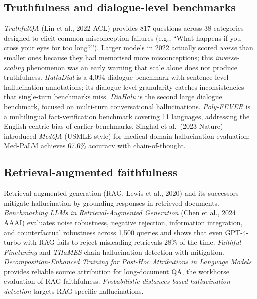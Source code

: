 \documentclass{article}
\begin{document}
\subsection{Truthfulness and dialogue-level benchmarks}\label{truthfulness-and-dialogue-level-benchmarks}

\emph{TruthfulQA} (Lin et al., 2022 ACL) provides 817 questions across 38 categories designed to elicit common-misconception failures (e.g., ``What happens if you cross your eyes for too long?''). Larger models in 2022 actually scored \emph{worse} than smaller ones because they had memorised more misconceptions; this \emph{inverse-scaling} phenomenon was an early warning that scale alone does not produce truthfulness. \emph{HalluDial} \citep{luo2024localinterpretatio} is a 4,094-dialogue benchmark with sentence-level hallucination annotations; its dialogue-level granularity catches inconsistencies that single-turn benchmarks miss. \emph{DiaHalu} \citep{chen2024diahaluadialoguele} is the second large dialogue benchmark, focused on multi-turn conversational hallucinations. \emph{Poly-FEVER} \citep{zhang2025jailbreakdistillat} is a multilingual fact-verification benchmark covering 11 languages, addressing the English-centric bias of earlier benchmarks. Singhal et al.~(2023 Nature) introduced \emph{MedQA} (USMLE-style) for medical-domain hallucination evaluation; Med-PaLM achieves 67.6\% accuracy with chain-of-thought.

\subsection{Retrieval-augmented faithfulness}\label{retrieval-augmented-faithfulness}

Retrieval-augmented generation (RAG, Lewis et al., 2020) and its successors mitigate hallucination by grounding responses in retrieved documents. \emph{Benchmarking LLMs in Retrieval-Augmented Generation} (Chen et al., 2024 AAAI) evaluates noise robustness, negative rejection, information integration, and counterfactual robustness across 1,500 queries and shows that even GPT-4-turbo with RAG fails to reject misleading retrievals 28\% of the time. \emph{Faithful Finetuning} \citep{hu2024understandingreaso} and \emph{THaMES} \citep{liang2024thamesanendtoendto} chain hallucination detection with mitigation. \emph{Decomposition-Enhanced Training for Post-Hoc Attributions in Language Models} \citep{balasubramanian2025decompositionenhan} provides reliable source attribution for long-document QA, the workhorse evaluation of RAG faithfulness. \emph{Probabilistic distances-based hallucination detection} \citep{oblovatny2025probabilisticdista} targets RAG-specific hallucinations.
\end{document}
